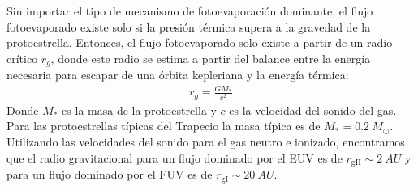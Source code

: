   
Sin importar el tipo de mecanismo de fotoevaporación dominante, el flujo fotoevaporado existe solo si la presión térmica supera a la gravedad de la protoestrella. Entonces, el flujo fotoevaporado solo existe a partir de un radio crítico $r_g$, donde este radio se estima a partir del balance entre la energía necesaria para escapar de una órbita kepleriana y la energía térmica:
\begin{align}
  r_g = \frac{GM_*}{c^2} \label{eq:grav-radius}
\end{align}
Donde $M_*$ es la masa de la protoestrella y $c$ es la velocidad del sonido del gas. Para las protoestrellas típicas del Trapecio la masa típica es de
$M_* = \SI{0.2}{M_\odot}$. Utilizando las velocidades del sonido para el gas neutro e ionizado, encontramos que el radio gravitacional para un flujo dominado por el EUV es de $r_{\mathrm{gII}} \sim \SI{2}{AU}$ y para un flujo dominado por el FUV es de $r_{\mathrm{gI}} \sim \SI{20}{AU}$.
